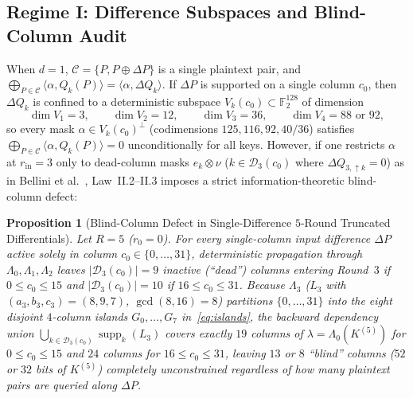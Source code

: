 \documentclass[11pt,a4paper]{article}
\newtheorem{proposition}{Proposition}
\theoremstyle{definition}
\theoremstyle{remark}
\newcommand{\Ftwo}{\mathbb{F}_2}
\newcommand{\supp}{\operatorname{supp}}
\begin{document}
\subsection{Regime I: Difference Subspaces and Blind-Column Audit}
\label{subsec:regime1}

When $d = 1$, $\mathcal{C} = \{P, P \oplus \Delta P\}$ is a single plaintext pair, and $\bigoplus_{P \in \mathcal{C}} \langle \alpha, Q_k(P)\rangle = \langle \alpha, \Delta Q_k\rangle$. If $\Delta P$ is supported on a single column $c_0$, then $\Delta Q_k$ is confined to a deterministic subspace $V_k(c_0) \subset \Ftwo^{128}$ of dimension
\[
\dim V_1 = 3,\qquad \dim V_2 = 12,\qquad \dim V_3 = 36,\qquad \dim V_4 = 88 \text{ or } 92,
\]
so every mask $\alpha \in V_k(c_0)^\perp$ (codimensions $125, 116, 92, 40/36$) satisfies $\bigoplus_{P \in \mathcal{C}} \langle \alpha, Q_k(P)\rangle = 0$ unconditionally for all keys. However, if one restricts $\alpha$ at $r_{\text{in}} = 3$ only to dead-column masks $e_k \otimes \nu$ ($k \in \mathcal{D}_3(c_0)$ where $\Delta Q_{3,\uparrow k} = 0$) as in Bellini et al.~\cite[$\S$6.2]{BBGHP25}, Law~II.2--II.3 imposes a strict information-theoretic blind-column defect:

\begin{proposition}[Blind-Column Defect in Single-Difference $5$-Round Truncated Differentials]
\label{prop:blind-cols}
Let $R = 5$ ($r_0 = 0$). For every single-column input difference $\Delta P$ active solely in column $c_0 \in \{0, \dots, 31\}$, deterministic propagation through $\Lambda_0, \Lambda_1, \Lambda_2$ leaves $|\mathcal{D}_3(c_0)| = 9$ inactive (``dead'') columns entering Round~$3$ if $0 \le c_0 \le 15$ and $|\mathcal{D}_3(c_0)| = 10$ if $16 \le c_0 \le 31$. Because $\Lambda_3$ ($L_3$ with $(a_3,b_3,c_3)=(8,9,7)$, $\gcd(8,16)=8$) partitions $\{0,\dots,31\}$ into the eight disjoint $4$-column islands $G_0, \dots, G_7$ in~\eqref{eq:islands}, the backward dependency union $\bigcup_{k \in \mathcal{D}_3(c_0)} \supp_k(L_3)$ covers exactly $19$ columns of $\lambda = \Lambda_0(K^{(5)})$ for $0 \le c_0 \le 15$ and $24$ columns for $16 \le c_0 \le 31$, leaving $13$ or $8$ ``blind'' columns ($52$ or $32$ bits of $K^{(5)}$) completely unconstrained regardless of how many plaintext pairs are queried along $\Delta P$.
\end{proposition}
\end{document}
